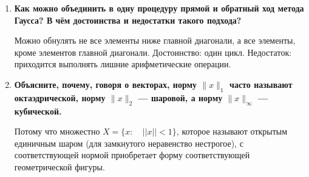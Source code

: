 \documentclass[12pt, a4paper]{article}
\begin{document}
\begin{enumerate}
\item{\bf Как можно объединить в одну процедуру прямой и обратный ход метода Гаусса? В чём достоинства и недостатки такого подхода?}

Можно обнулять не все элементы ниже главной диагонали, а все элементы, кроме элементов главной диагонали. Достоинство: один цикл. Недостаток: приходится выполнять лишние арифметические операции.


\item{\bf Объясните, почему, говоря о векторах, норму $\|x\|_{1}$ часто называют октаэдрической, норму $\|x\|_{2}$ --- шаровой, а норму $\|x\|_{\infty}$ --- кубической.}

Потому что множестно $X = \{x:\quad ||x||<1\}$, которое называют открытым единичным шаром (для замкнутого неравенство нестрогое), с соответствующей нормой приобретает форму соответствующей геометрической фигуры. 

\end{enumerate}
\newpage
\end{document}
